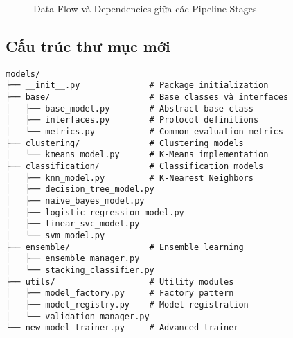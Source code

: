 \begin{figure}[H]
\caption{Data Flow và Dependencies giữa các Pipeline Stages}
\label{fig:data_flow_dependencies}
\end{figure}

\subsection{Cấu trúc thư mục mới}

\begin{verbatim}
models/
├── __init__.py              # Package initialization
├── base/                    # Base classes và interfaces
│   ├── base_model.py        # Abstract base class
│   ├── interfaces.py        # Protocol definitions
│   └── metrics.py           # Common evaluation metrics
├── clustering/              # Clustering models
│   └── kmeans_model.py      # K-Means implementation
├── classification/          # Classification models
│   ├── knn_model.py         # K-Nearest Neighbors
│   ├── decision_tree_model.py
│   ├── naive_bayes_model.py
│   ├── logistic_regression_model.py
│   ├── linear_svc_model.py
│   └── svm_model.py
├── ensemble/                # Ensemble learning
│   ├── ensemble_manager.py
│   └── stacking_classifier.py
├── utils/                   # Utility modules
│   ├── model_factory.py     # Factory pattern
│   ├── model_registry.py    # Model registration
│   └── validation_manager.py
└── new_model_trainer.py     # Advanced trainer
\end{verbatim}

